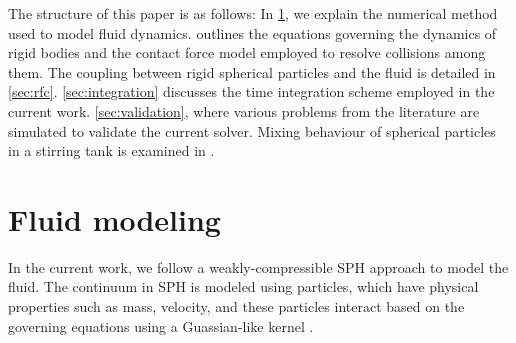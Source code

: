 \documentclass[preprint,12pt]{elsarticle}
\begin{document}



The structure of this paper is as follows: In \cref{sec:fluid-modeling}, we
explain the numerical method used to model fluid dynamics. 
outlines the equations governing the dynamics of rigid bodies and the contact
force model employed to resolve collisions among them. The coupling between
rigid spherical particles and the fluid is detailed in
\cref{sec:rfc}. \cref{sec:integration} discusses the time integration scheme
employed in the current work.  \cref{sec:validation}, where various problems
from the literature are simulated to validate the current solver.  Mixing
behaviour of spherical particles in a stirring tank is examined in
.



\FloatBarrier%
\section{Fluid modeling}
\label{sec:fluid-modeling}
In the current work, we follow a weakly-compressible SPH approach to model the
fluid. The continuum in SPH is modeled using particles, which have physical
properties such as mass, velocity, and these particles interact based on the
governing equations using a Guassian-like kernel
\cite{monaghan-review:2005,morris1997modeling}.
\end{document}
